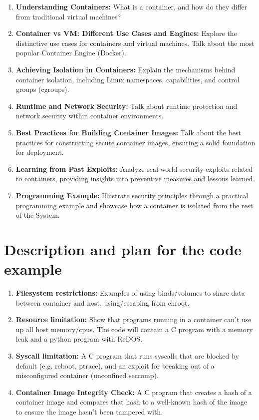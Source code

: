 \documentclass{article}
\begin{document}
\begin{enumerate}
    \item \textbf{Understanding Containers:}
    What is a container, and how do they differ from traditional virtual machines?

    \item \textbf{Container vs VM: Different Use Cases and Engines:}
    Explore the distinctive use cases for containers and virtual machines. 
    Talk about the most popular Container Engine (Docker).

    \item \textbf{Achieving Isolation in Containers:}
    Explain the mechanisms behind container isolation, including Linux namespaces, 
    capabilities, and control groups (cgroups).

    \item \textbf{Runtime and Network Security:}
    Talk about runtime protection and network security within container environments.

    \item \textbf{Best Practices for Building Container Images:}
    Talk about the best practices for constructing secure container images, 
    ensuring a solid foundation for deployment.

    \item \textbf{Learning from Past Exploits:}
    Analyze real-world security exploits related to containers, 
    providing insights into preventive measures and lessons learned.

    \item \textbf{Programming Example:}
    Illustrate security principles through a practical programming example and showcase how 
    a container is isolated from the rest of the System.
\end{enumerate}

\bigskip
\section{Description and plan for the code example}

\begin{enumerate}
\item \textbf{Filesystem restrictions:} Examples of using binds/volumes to share data between container and host, 
using/escaping from chroot.
\item \textbf{Resource limitation:} Show that programs running in a container can't use up all host memory/cpus.
The code will contain a C program with a memory leak and a python program with ReDOS.
\item \textbf{Syscall limitation:} A C program that runs syscalls that are blocked by default (e.g. reboot, ptrace), 
and an exploit for breaking out of a misconfigured container (unconfined seccomp).
\item \textbf{Container Image Integrity Check:} A C program that creates a hash of a container image and 
compares that hash to a well-known hash of the image to ensure the image hasn't been tampered with.
\end{enumerate}
\end{document}
